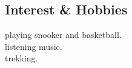 \documentclass[margin,line]{resume}
\begin{document}
\begin{resume}
    \section{\mysidestyle Interest \& Hobbies}
    playing snooker and basketball.\\
    listening music.\\
    trekking.\\ 

\end{resume}
\end{document}
